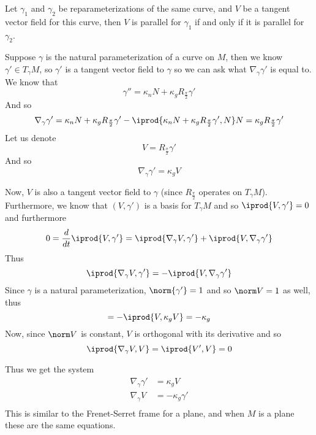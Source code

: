 \begin{prop*}

    Let $\gamma_1$ and $\gamma_2$ be reparameterizations of the same curve, and $V$ be a tangent vector field for this curve, then $V$ is parallel for $\gamma_1$ if and only if it is parallel for $\gamma_2$.

\end{prop*}

\begin{exam*}

    Suppose $\gamma$ is the natural parameterization of a  curve on $M$, then we know $\gamma'\in T_\gamma M$, so $\gamma'$ is a tangent vector field to $\gamma$ so we can ask what $\nabla_\gamma\gamma'$ is
    equal to.
    We know that
    \[ \gamma'' = \kappa_n N + \kappa_g R_{\frac\pi2}\gamma' \]
    And so
    \[ \nabla_\gamma\gamma' = \kappa_n N + \kappa_g R_{\frac\pi2}\gamma' - \iprod{\kappa_n N + \kappa_g R_{\frac\pi2}\gamma',N}N = \kappa_g R_{\frac\pi2}\gamma' \]
    Let us denote
    \[ V = R_{\frac\pi2}\gamma' \]
    And so
    \[ \nabla_\gamma\gamma' = \kappa_g V \]

    Now, $V$ is also a tangent vector field to $\gamma$ (since $R_{\frac\pi2}$ operates on $T_\gamma M$).
    Furthermore, we know that $(V,\gamma')$ is a basis for $T_\gamma M$ and so $\iprod{V,\gamma'}=0$ and furthermore
    \[ 0 = \frac d{dt}\iprod{V,\gamma'} = \iprod{\nabla_\gamma V,\gamma'} + \iprod{V,\nabla_\gamma\gamma'} \]
    Thus
    \[ \iprod{\nabla_\gamma V,\gamma'} = -\iprod{V,\nabla_\gamma\gamma'} \]
    Since $\gamma$ is a natural parameterization, $\norm{\gamma'}=1$ and so $\norm V=1$ as well, thus
    \[ = -\iprod{V,\kappa_g V} = -\kappa_g \]
    Now, since $\norm V$ is constant, $V$ is orthogonal with its derivative and so
    \[ \iprod{\nabla_\gamma V,V} = \iprod{V',V} = 0 \]

    Thus we get the system
    \begin{align*}
        \nabla_\gamma\gamma' &= \kappa_g V \\
        \nabla_\gamma V &= -\kappa_g\gamma' \\ 
    \end{align*}
    This is similar to the Frenet-Serret frame for a plane, and when $M$ is a plane these are the same equations.

\end{exam*}

